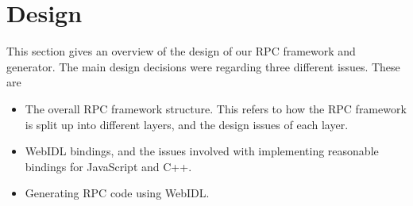 \chapter{Design}
\label{Chapter4}

This section gives an overview of the design of our RPC framework and generator. The main design decisions were regarding three different issues. These are

\begin{itemize}
	\item The overall RPC framework structure. This refers to how the RPC framework is split up into different layers, and the design issues of each layer.
	\item WebIDL bindings, and the issues involved with implementing reasonable bindings for JavaScript and C++.
	\item Generating RPC code using WebIDL.
\end{itemize}


\newpage


\newpage


\newpage